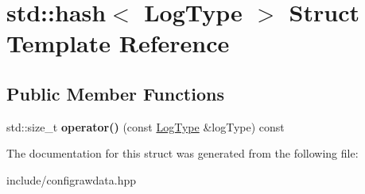 \hypertarget{structstd_1_1hash_3_01LogType_01_4}{}\section{std\+:\+:hash$<$ Log\+Type $>$ Struct Template Reference}
\label{structstd_1_1hash_3_01LogType_01_4}
\subsection*{Public Member Functions}
\begin{DoxyCompactItemize}
\item 
std\+::size\+\_\+t {\bfseries operator()} (const \hyperlink{structLogType}{Log\+Type} \&log\+Type) const \hypertarget{structstd_1_1hash_3_01LogType_01_4_ade291943054605ef35130191ac0ac864}{}\label{structstd_1_1hash_3_01LogType_01_4_ade291943054605ef35130191ac0ac864}

\end{DoxyCompactItemize}


The documentation for this struct was generated from the following file\+:\begin{DoxyCompactItemize}
\item 
include/configrawdata.\+hpp\end{DoxyCompactItemize}
